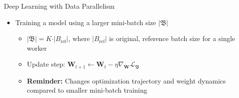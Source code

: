 \begin{frame}{Deep Learning with Data Parallelism}
\protect\hypertarget{deep-learning-with-data-parallelism-5}{}

\begin{itemize}
\tightlist
\item
  Training a model using a larger mini-batch size
  \(\vert \mathfrak{B} \vert\)

  \begin{itemize}
  \tightlist
  \item
    \(\vert \mathfrak{B} \vert = K \cdot \vert B_{\text{ref}} \vert\),
    where \(\vert B_{\text{ref}} \vert\) is original, reference batch
    size for a single worker
  \item
    Update step:
    \(\mathbf{W}_{t+1} \leftarrow \mathbf{W}_t - \eta \nabla_\mathbf{W} \mathcal{L}_{\mathfrak{B}}\)
  \item
    \textbf{Reminder:} Changes optimization trajectory and weight
    dynamics compared to smaller mini-batch training
  \end{itemize}
\end{itemize}


\end{frame}

